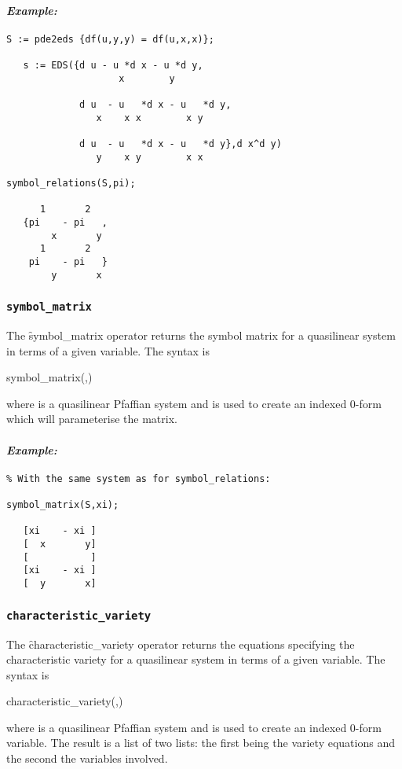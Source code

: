 \paragraph{\it Example:}
\begin{verbatim}
S := pde2eds {df(u,y,y) = df(u,x,x)};

   s := EDS({d u - u *d x - u *d y,
                    x        y
   
             d u  - u   *d x - u   *d y,
                x    x x        x y

             d u  - u   *d x - u   *d y},d x^d y)
                y    x y        x x

symbol_relations(S,pi);

      1       2 
   {pi    - pi   ,
        x       y 
      1       2 
    pi    - pi   }
        y       x 
\end{verbatim}

\subsubsection{\tt symbol\_matrix}
\label{symbol_matrix}

The \f{symbol\_matrix} operator returns the symbol matrix for a quasilinear
system in terms of a given variable. The syntax is
\begin{syntax}
	symbol\_matrix(,)
\end{syntax}
where  is a quasilinear Pfaffian system and  is
used to create an indexed 0-form which will parameterise the matrix.

\paragraph{\it Example:}
\begin{verbatim}
% With the same system as for symbol_relations:

symbol_matrix(S,xi);

   [xi    - xi ]
   [  x       y]
   [           ]
   [xi    - xi ]
   [  y       x]
\end{verbatim}

\subsubsection{\tt characteristic\_variety}
\label{characteristic_variety}

The \f{characteristic\_variety} operator returns the equations specifying
the characteristic variety for a quasilinear
system in terms of a given variable. The syntax is
\begin{syntax}
	characteristic\_variety(,)
\end{syntax}
where  is a quasilinear Pfaffian system and  is
used to create an indexed 0-form variable. The result is a list of two
lists: the first being the variety equations and the second the variables
involved.

